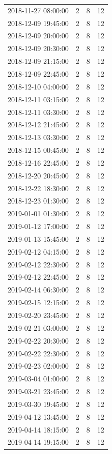 \begin{tabular}{lrrr}
2018-11-27 08:00:00 & 2 & 8 & 12 \\
2018-12-09 19:45:00 & 2 & 8 & 12 \\
2018-12-09 20:00:00 & 2 & 8 & 12 \\
2018-12-09 20:30:00 & 2 & 8 & 12 \\
2018-12-09 21:15:00 & 2 & 8 & 12 \\
2018-12-09 22:45:00 & 2 & 8 & 12 \\
2018-12-10 04:00:00 & 2 & 8 & 12 \\
2018-12-11 03:15:00 & 2 & 8 & 12 \\
2018-12-11 03:30:00 & 2 & 8 & 12 \\
2018-12-12 21:45:00 & 2 & 8 & 12 \\
2018-12-13 03:30:00 & 2 & 8 & 12 \\
2018-12-15 00:45:00 & 2 & 8 & 12 \\
2018-12-16 22:45:00 & 2 & 8 & 12 \\
2018-12-20 20:45:00 & 2 & 8 & 12 \\
2018-12-22 18:30:00 & 2 & 8 & 12 \\
2018-12-23 01:30:00 & 2 & 8 & 12 \\
2019-01-01 01:30:00 & 2 & 8 & 12 \\
2019-01-12 17:00:00 & 2 & 8 & 12 \\
2019-01-13 15:45:00 & 2 & 8 & 12 \\
2019-02-12 04:15:00 & 2 & 8 & 12 \\
2019-02-12 22:30:00 & 2 & 8 & 12 \\
2019-02-12 22:45:00 & 2 & 8 & 12 \\
2019-02-14 06:30:00 & 2 & 8 & 12 \\
2019-02-15 12:15:00 & 2 & 8 & 12 \\
2019-02-20 23:45:00 & 2 & 8 & 12 \\
2019-02-21 03:00:00 & 2 & 8 & 12 \\
2019-02-22 20:30:00 & 2 & 8 & 12 \\
2019-02-22 22:30:00 & 2 & 8 & 12 \\
2019-02-23 02:00:00 & 2 & 8 & 12 \\
2019-03-04 01:00:00 & 2 & 8 & 12 \\
2019-03-21 23:45:00 & 2 & 8 & 12 \\
2019-03-30 19:45:00 & 2 & 8 & 12 \\
2019-04-12 13:45:00 & 2 & 8 & 12 \\
2019-04-14 18:15:00 & 2 & 8 & 12 \\
2019-04-14 19:15:00 & 2 & 8 & 12 \\

\end{tabular}
